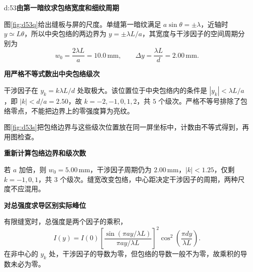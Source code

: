 \begin{drillsolution}{d:53}\textbf{由第一暗纹求包络宽度和细纹周期}\par\nobreak
图\ref{fig:d53q}给出缝板与屏的尺度。单缝第一暗纹满足 \(a\sin\theta=\pm\lambda\)，近轴时 \(y\simeq L\theta\)，所以中央包络的两边界为 \(y=\pm\lambda L/a\)，其宽度与干涉因子的空间周期分别为
\[
 \boxed{w_0=\frac{2\lambda L}{a}=10.0\,\mathrm{mm}},\qquad
 \boxed{\Delta y=\frac{\lambda L}{d}=2.00\,\mathrm{mm}}.
\]


\par\medskip{}\noindent\textbf{用严格不等式数出中央包络级次}\par\nobreak
干涉因子在 \(y_k=k\lambda L/d\) 处取极大。该位置位于中央包络内的条件是 \(|y_k|<\lambda L/a\)，即 \(|k|<d/a=2.50\)，故 \(k=-2,-1,0,1,2\)，共 \(\boxed{5}\) 个级次。严格不等号排除了包络零点，不能把边界上的零强度算为亮纹。

图\ref{fig:d53s}把包络边界与这些级次位置放在同一屏坐标中，计数由不等式得到，再用图检查。


\par\medskip{}\noindent\textbf{重新计算包络边界和级次数}\par\nobreak
若 \(a\) 加倍，则 \(w_0=5.00\,\mathrm{mm}\)，干涉因子周期仍为 \(2.00\,\mathrm{mm}\)，\(|k|<1.25\)，仅剩 \(k=-1,0,1\)，共 \(\boxed{3}\) 个级次。缝宽改变包络，中心距决定干涉因子的周期，两种尺度不应混用。



\par\medskip{}\noindent\textbf{对总强度求导区别实际峰位}\par\nobreak
有限缝宽时，总强度是两个因子的乘积，
\[
 I(y)=I(0)\left[\frac{\sin(\pi ay/\lambda L)}{\pi ay/\lambda L}\right]^2
 \cos^2\!\left(\frac{\pi dy}{\lambda L}\right).
\]
在非中心的 \(y_k\) 处，干涉因子的导数为零，但包络的导数一般不为零，故乘积的导数未必为零。


\end{drillsolution}
